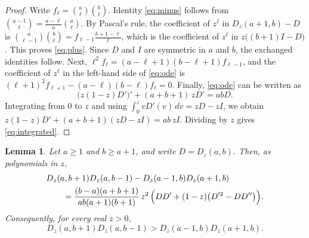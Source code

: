 \documentclass{amsart}
\newtheorem{lemma}[theorem]{Lemma}
\theoremstyle{definition}
\theoremstyle{remark}
\numberwithin{equation}{section}
\numberwithin{table}{section}
\newcommand{\Dz}{D_z}
\begin{document}
\begin{proof}
Write $f_\ell=\binom{a}{\ell}\binom{b}{\ell}$. Identity \eqref{eq:minus} follows from $\binom{a-1}{\ell}=\frac{a-\ell}{a}\binom{a}{\ell}$. By Pascal's rule, the coefficient of $z^{\ell}$ in $\Dz(a+1,b)-D$ is $\binom{a}{\ell-1}\binom{b}{\ell}=f_{\ell-1}\frac{b+1-\ell}{\ell}$, which is the coefficient of $z^\ell$ in $z\bigl((b+1)I-D\bigr)$. This proves \eqref{eq:plus}. Since $D$ and $I$ are symmetric in $a$ and $b$, the exchanged identities follow. Next, $\ell^2f_\ell=(a-\ell+1)(b-\ell+1)f_{\ell-1}$, and the coefficient of $z^{\ell}$ in the left-hand side of \eqref{eq:ode} is $(\ell+1)^2f_{\ell+1}-(a-\ell)(b-\ell)f_\ell=0$. Finally, \eqref{eq:ode} can be written as
\[
\bigl(z(1-z)D'\bigr)'+(a+b+1)\,zD'=abD .
\]
Integrating from $0$ to $z$ and using $\int_0^z vD'(v)\,dv=zD-zI$, we obtain $z(1-z)D'+(a+b+1)(zD-zI)=ab\,zI$. Dividing by $z$ gives \eqref{eq:integrated}.
\end{proof}

\begin{lemma}\label{lem:ratio}
Let $a\ge 1$ and $b\ge a+1$, and write $D=\Dz(a,b)$. Then, as polynomials in $z$,
\begin{equation}\label{eq:ratio-identity}
\begin{aligned}
&\Dz(a,b+1)\Dz(a,b-1)-\Dz(a-1,b)\Dz(a+1,b)\\
&\qquad=\frac{(b-a)(a+b+1)}{ab(a+1)(b+1)}\,z^2\,\Bigl(DD'+(1-z)\bigl(D'^2-DD''\bigr)\Bigr).
\end{aligned}
\end{equation}
Consequently, for every real $z>0$,
\begin{equation}\label{eq:ratio}
\Dz(a,b+1)\Dz(a,b-1)>\Dz(a-1,b)\Dz(a+1,b).
\end{equation}
\end{lemma}
\end{document}
